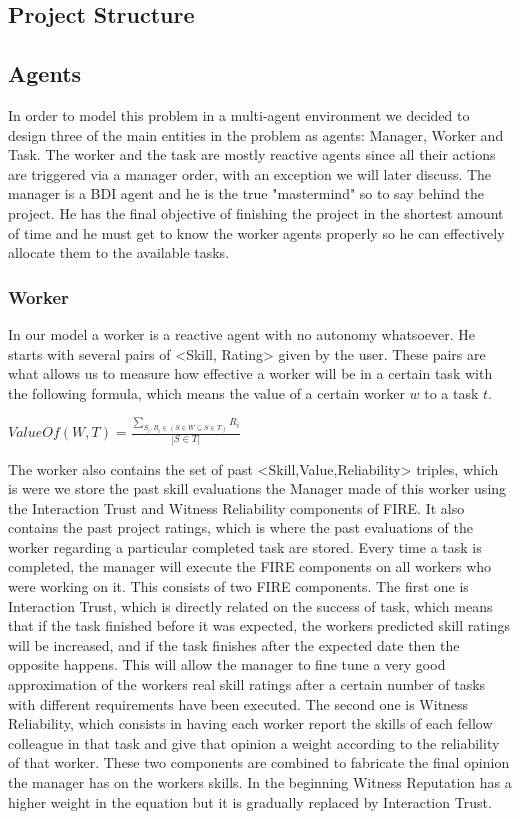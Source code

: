 \documentclass[paper=a4, fontsize=11pt]{scrartcl} %
\numberwithin{equation}{section} %
\numberwithin{figure}{section} %
\numberwithin{table}{section} %
\begin{document}
\subsection{Project Structure}

\subsection{Agents}
In order to model this problem in a multi-agent environment we decided to design three of the main entities in the problem as agents: Manager, Worker and Task. The worker and the task are mostly reactive agents since all their actions are triggered via a manager order, with an exception we will later discuss. The manager is a BDI agent and he is the true "mastermind" so to say behind the project. He has the final objective of finishing the project in the shortest amount of time and he must get to know the worker agents properly so he can effectively allocate them to the available tasks.

\subsubsection{Worker}
In our model a worker is a reactive agent with no autonomy whatsoever. He starts with several pairs of <Skill, Rating> given by the user. These pairs are what allows us to measure how effective a worker will be in a certain task with the following formula, which means the value of a certain worker $w$ to a task $t$.
\begin{center}
	$
	ValueOf(W,T) = 
	\frac
	{\sum\nolimits_{S_i,R_i \in (S \in W \subseteq S \in T )} R_i}
	{|S \in T |}
	$
\end{center}
The worker also contains the set of past <Skill,Value,Reliability> triples, which is were we store the past skill evaluations the Manager made of this worker using the Interaction Trust and Witness Reliability components of FIRE. It also contains the past project ratings, which is where the past evaluations of the worker regarding a particular completed task are stored. Every time a task is completed, the manager will execute the FIRE components on all workers who were working on it. This consists of two FIRE components. The first one is Interaction Trust, which is directly related on the success of task, which means that if the task finished before it was expected, the workers predicted skill ratings will be increased, and if the task finishes after the expected date then the opposite happens. This will allow the manager to fine tune a very good approximation of the workers real skill ratings after a certain number of tasks with different requirements have been executed. The second one is Witness Reliability, which consists in having each worker report the skills of each fellow colleague in that task and give that opinion a weight according to the reliability of that worker. These two components are combined to fabricate the final opinion the manager has on the workers skills. In the beginning Witness Reputation has a higher weight in the equation but it is gradually replaced by Interaction Trust.
\end{document}
